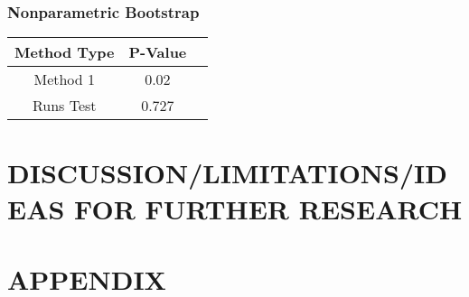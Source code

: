 \documentclass[12pt, letterpaper]{article}
\begin{document}
\subsubsection{Nonparametric Bootstrap}
\begin{tabular}{|c|c|c|}
\hline
\textbf{Method Type} & P-Value \\
\hline
Method 1 & 0.02  \\
\hline
Runs Test & 0.727 \\ 
\hline
\end{tabular}

\section{DISCUSSION/LIMITATIONS/IDEAS FOR FURTHER RESEARCH}


\section{APPENDIX}
\end{document}

